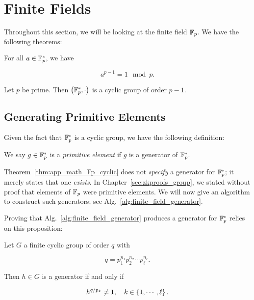 \section{Finite Fields}
\label{app:math_finite_fields}

Throughout this section, we will be looking at the \gls{finite field} $\mathbb{F}_{p}$.
We have the following theorems:

\begin{thm}
\label{thm:app_math_Fermat_Little}
For all $a\in\mathbb{F}_{p}^{*}$, we have

\begin{equation}
    a^{p-1} = 1 \mod p.
\end{equation}
\end{thm}

\begin{thm}
\label{thm:app_math_Fp_cyclic}
Let $p$ be prime.
Then $\left( \mathbb{F}_{p}^{*},\cdot \right)$ is a \gls{cyclic group} of order $p-1$.
\end{thm}

\subsection{Generating Primitive Elements}
\label{app:math_finite_fields_primitive}

Given the fact that $\mathbb{F}_{p}^{*}$ is a \gls{cyclic group},
we have the following definition:

\begin{defn}
We say $g\in\mathbb{F}_{p}^{*}$ is a \emph{primitive element}
if $g$ is a generator of $\mathbb{F}_{p}^{*}$.
\end{defn}

Theorem~\ref{thm:app_math_Fp_cyclic} does not \emph{specify}
a generator for $\mathbb{F}_{p}^{*}$;
it merely states that one \emph{exists}.
In Chapter~\ref{sec:zkproofs_group}, we stated without proof that
elements of $\mathbb{F}_{p}$ were primitive elements.
We will now give an algorithm to construct such generators;
see Alg.~\ref{alg:finite_field_generator}.



Proving that Alg.~\ref{alg:finite_field_generator} produces
a generator for $\mathbb{F}_{p}^{*}$ relies on this proposition:

\begin{prop}
\label{prop:math_finite_cyclic_generator}
Let $G$ a \gls{finite cyclic group} of order $q$ with

\begin{equation}
    q = p_{1}^{n_{1}}p_{2}^{n_{2}}\cdots p_{\ell}^{n_{\ell}}.
\end{equation}

\noindent
Then $h\in G$ is a generator if and only if

\begin{equation}
    h^{q/p_{k}} \ne 1, \quad k\in\left\{ 1,\cdots,\ell \right\}.
\end{equation}
\end{prop}

